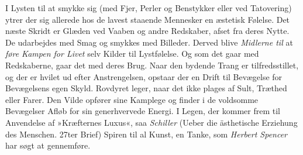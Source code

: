 \documentclass[12pt,a4paper,openany]{book}
\newcommand{\opage}[1]{\marginnote{\footnotesize\textit{[#1]}}}
\begin{document}
I Lysten til at smykke sig (med Fjer, Perler og Benstykker eller ved
Tatovering) ytrer der sig allerede hos de lavest staaende Mennesker en
æstetisk Følelse. Det næste Skridt er Glæden ved Vaaben og andre
Redskaber, afset fra deres Nytte. De udarbejdes med Smag og smykkes med
Billeder. Derved blive \emph{Midlerne til} at \emph{føre Kampen for
Livet} selv Kilder til Lystfølelse. Og som det gaar med Redskaberne,
gaar det med deres Brug. Naar den bydende Trang er tilfredsstillet, og
der er hvilet ud efter Anstrengelsen,
\opage{316}opstaar der en Drift til Bevægelse for Bevægelsens egen
Skyld. Rovdyret leger, naar det ikke plages af Sult, Træthed eller
Farer. Den Vilde opfører sine Kamplege og finder i de voldsomme
Bevægelser Afløb for sin generhvervede Energi. I Legen, der kommer frem
til Anvendelse af »Kræfternes Luxus«, saa \emph{Schiller} (Ueber die
ästhetische Erziehung des Menschen. 27ter Brief) Spiren til al Kunst, en
Tanke, som \emph{Herbert Spencer} har søgt at gennemføre.
\end{document}
